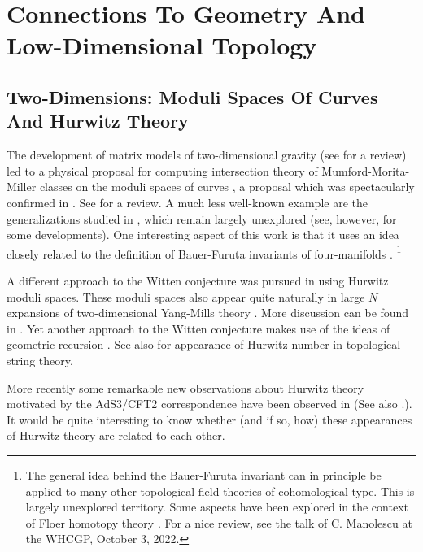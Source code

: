 \documentclass[12pt]{article}
\begin{document}
 


\section{Connections To Geometry And Low-Dimensional Topology}\label{sec:InteractionsLowDimensional}

\subsection{Two-Dimensions: Moduli Spaces Of Curves And Hurwitz Theory}
 
The development of matrix models of two-dimensional gravity 
\cite{Brezin:1990rb,Douglas:1989ve,Gross:1989vs} 
(see \cite{Ginsparg:1993is} for a review) led to a physical proposal 
for computing intersection theory of Mumford-Morita-Miller classes on the moduli spaces of 
curves \cite{Witten:1990hr}, a proposal which was spectacularly 
confirmed in \cite{Kontsevich:1992ti}. See 
\cite{Looijenga-ModuliIntersectionReview}  for a review. 
A much less well-known 
example are the generalizations studied in \cite{WittenAgebraicGeometryMatrixModel}, 
which remain largely unexplored (see, however, \cite{Polishchuk-Spinr-Curves} for some developments). One interesting aspect of this work is that it uses an idea closely related to the definition of Bauer-Furuta invariants of four-manifolds \cite{Bauer-Furuta}.  
%
\footnote{The general idea behind the Bauer-Furuta 
invariant can in principle be applied to many other topological field theories of cohomological type. This is largely unexplored territory. Some aspects have been explored in the context of Floer homotopy theory
\cite{CohenJonesSegal1,CohenJonesSegal2,Manolescu}.
For a nice review, see the talk of C. Manolescu at the WHCGP, October 3, 2022. }

A different approach to the Witten conjecture was 
pursued in \cite{okounkov2001generating,Okounkov:2000gx} using Hurwitz moduli spaces. 
These moduli spaces also appear quite naturally in large $N$ expansions of two-dimensional Yang-Mills theory \cite{Gross:1993hu,Cordes:1994sd,Cordes:1994fc,
Moore-ICM94}. More discussion
can be found in \cite{Commando}.  Yet another approach to
the Witten conjecture makes use of the ideas of geometric recursion 
\cite{andersen2019geometric,Andersen:2020ylr}. See also \cite{Bouchard:2007hi} for appearance of Hurwitz number in topological string theory.

{}More recently some remarkable new observations about Hurwitz theory motivated by the AdS3/CFT2 correspondence have been observed in  
\cite{Dei:2021yom} (See also \cite{Lunin:2000yv,Pakman:2009zz}.). 
It would be quite interesting to know whether (and if so, how) 
these appearances of Hurwitz theory are related to each other. 
\end{document}
